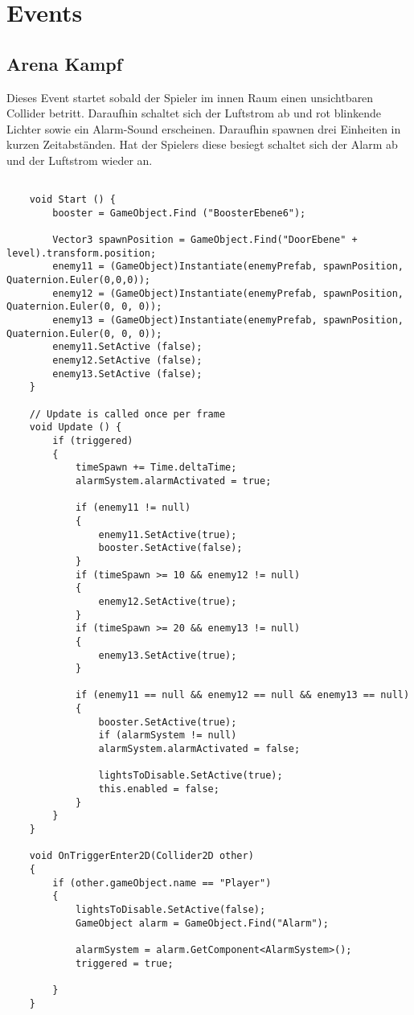 \chapter{Events}

\section {Arena Kampf}
Dieses Event startet sobald der Spieler im innen Raum einen unsichtbaren Collider betritt. Daraufhin schaltet sich der Luftstrom ab und rot blinkende Lichter sowie ein Alarm-Sound erscheinen. Daraufhin spawnen drei Einheiten in kurzen Zeitabständen. Hat der Spielers diese besiegt schaltet sich der Alarm ab und der Luftstrom wieder an.

\begin{lstlisting}[breaklines = true]

	void Start () {
		booster = GameObject.Find ("BoosterEbene6");
		
		Vector3 spawnPosition = GameObject.Find("DoorEbene" + level).transform.position;
		enemy11 = (GameObject)Instantiate(enemyPrefab, spawnPosition, Quaternion.Euler(0,0,0));
		enemy12 = (GameObject)Instantiate(enemyPrefab, spawnPosition, Quaternion.Euler(0, 0, 0));
		enemy13 = (GameObject)Instantiate(enemyPrefab, spawnPosition, Quaternion.Euler(0, 0, 0));
		enemy11.SetActive (false);
		enemy12.SetActive (false);
		enemy13.SetActive (false);
	}
	
	// Update is called once per frame
	void Update () {
		if (triggered)
		{
			timeSpawn += Time.deltaTime;
			alarmSystem.alarmActivated = true;
			
			if (enemy11 != null)
			{
				enemy11.SetActive(true);
				booster.SetActive(false);
			}
			if (timeSpawn >= 10 && enemy12 != null)
			{
				enemy12.SetActive(true);
			}
			if (timeSpawn >= 20 && enemy13 != null)
			{
				enemy13.SetActive(true);
			}
			
			if (enemy11 == null && enemy12 == null && enemy13 == null)
			{
				booster.SetActive(true);
				if (alarmSystem != null)
				alarmSystem.alarmActivated = false;
				
				lightsToDisable.SetActive(true);
				this.enabled = false;
			}
		}
	}
		
	void OnTriggerEnter2D(Collider2D other)
	{
		if (other.gameObject.name == "Player")
		{
			lightsToDisable.SetActive(false);
			GameObject alarm = GameObject.Find("Alarm");
				
			alarmSystem = alarm.GetComponent<AlarmSystem>();
			triggered = true;
		
		}
	}

\end{lstlisting}